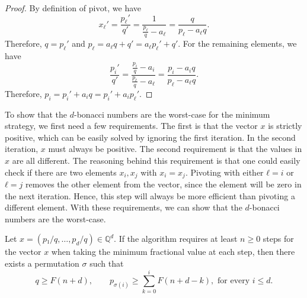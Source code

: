\begin{proof}
  By definition of $\mathrm{pivot}$, we have
  \[
    x_ℓ' = \frac{p_ℓ'}{q'} = \frac{1}{\frac{p_ℓ}{q} - a_ℓ} = \frac{q}{p_ℓ - a_ℓ q}.
  \]
  Therefore, $q = p_ℓ'$ and $p_ℓ = a_ℓ q + q' = a_ℓ p_ℓ' + q'$.
  For the remaining elements, we have
  \[
    \frac{p_i'}{q'} = \frac{\frac{p_i}{q} - a_i}{\frac{p_ℓ}{q} - a_ℓ} = \frac{p_i - a_i q}{p_ℓ - a_ℓ q}.
  \]
  Therefore, $p_i = p_i' + a_i q = p_i' + a_i p_ℓ'$.
\end{proof}

To show that the $d$-bonacci numbers are the worst-case for the minimum
strategy, we first need a few requirements.
The first is that the vector $x$ is strictly positive,
which can be easily solved by ignoring the first iteration.
In the second iteration, $x$ must always be positive.
The second requirement is that the values in $x$ are all different.
The reasoning behind this requirement is that one could easily check if there
are two elements $x_i, x_j$ with $x_i = x_j$.
Pivoting with either $ℓ = i$ or $ℓ = j$ removes the other element from the
vector, since the element will be zero in the next iteration.
Hence, this step will always be more efficient than pivoting a different element.
With these requirements, we can show that the $d$-bonacci numbers are the worst-case.

\begin{theorem}
  Let $x = (p₁/q, …, p_d/q) ∈ ℚ^d$.
  If the algorithm requires at least $n ≥ 0$ steps for the vector $x$ when
  taking the minimum fractional value at each step, then there exists a permutation $σ$ such
  that
  \[
    q ≥ F(n+d),
    \qquad
    p_{σ(i)} ≥ \sum_{k = 0}^i F(n+d - k),
    \text{ for every } i ≤ d.
  \]
\end{theorem}

